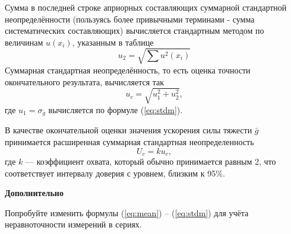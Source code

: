\documentclass[12pt, a4paper]{article}
\theoremstyle{remark}
\begin{document}
\begin{enumerate}
    Сумма в последней строке априорных составляющих суммарной стандартной неопределённости 
    (пользуясь более привычными
    терминами - сумма систематических составляющих) вычисляется стандартным методом по величинам
    $u \left( x_i \right)$, указанным в таблице
    \begin{equation}
        u_2 =  \sqrt{\sum u^2(x_i)}
    \end{equation}
    Суммарная стандартная неопределённость, то есть оценка точности окончательного результата,
    вычисляется так
    \begin{equation}
        u_c = \sqrt{u_1^2 + u_2^2},
    \end{equation}
    где $u_1 = \sigma_{\bar{g}}$ вычисляется по формуле (\ref{eq:stdm}).

    В качестве окончательной оценки значения ускорения силы тяжести $\bar{g}$ принимается
    расширенная суммарная стандартная неопределенность
    \begin{equation}
        U_c = k u_c,
    \end{equation}
    где $k$ --- коэффициент охвата, который обычно принимается равным 2, что соответствует 
    интервалу доверия с уровнем, близким к 95\%.
\end{enumerate}

\begin{center}
    \textbf{Дополнительно}
\end{center}

Попробуйте изменить формулы (\ref{eq:mean}) -- (\ref{eq:stdm}) для учёта неравноточности измерений в
сериях.

\end{document}
